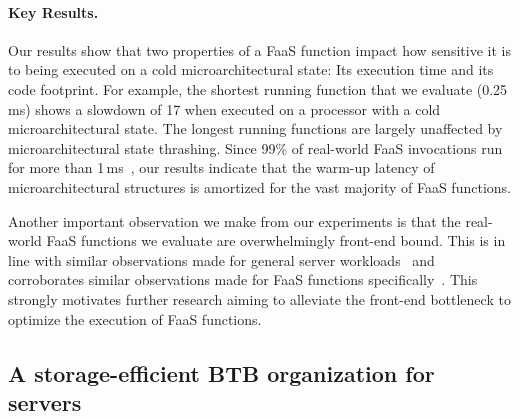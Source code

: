 \documentclass[../main.tex]{subfiles}
\begin{document}
\begin{refsection}
\paragraph{Key Results.}
Our results show that two properties of a FaaS function impact how
sensitive it is to being executed on a cold microarchitectural state:
Its execution time and its code footprint. For example, the shortest
running function that we evaluate (0.25\,ms) shows a slowdown of
17\texttimes{} when executed on a processor with a cold
microarchitectural state. The longest running functions are largely
unaffected by microarchitectural state thrashing. Since 99\% of
real-world FaaS invocations run for more than
1\,ms~\cite{shahrad20_server_wild}, our results indicate that the
warm-up latency of microarchitectural structures is amortized for the
vast majority of FaaS functions.

Another important observation we make from our experiments is that the
real-world FaaS functions we evaluate are overwhelmingly front-end
bound. This is in line with similar observations made for general
server
workloads~\cite{ferdman12_clear_cloud,kanev15_profil,ayers19_asmdb}
and corroborates similar observations made for FaaS functions
specifically~\cite{lukewarm_serverless}. This strongly motivates
further research aiming to alleviate the front-end bottleneck to
optimize the execution of FaaS functions.



\subsection{A storage-efficient BTB organization for servers}
\label{subsub:btbx}


\end{refsection}
\end{document}
